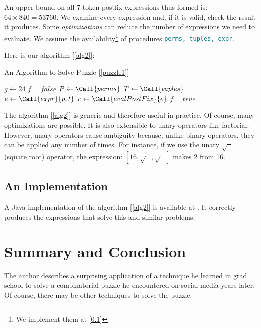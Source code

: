 \documentclass[english,smartquotes]{hgbarticle}
\begin{document}
An upper bound on all 7-token postfix expressions thus formed is: $64\times 840 = 53760$. We examine every expression and, if it is valid, check the result it produces. Some \emph{optimizations} can reduce the number of expressions we need to evaluate. We assume the availability\footnote{We implement them at [\ref{ss:impl}]} of procedures \texttt{\textcolor{teal}{perms, tuples, expr}}.  

Here is our algorithm [\ref{alg2}]:
\begin{algorithm}
\caption{An Algorithm to Solve Puzzle [\ref{puzzle1}]}
\label{alg2}
\begin{algorithmic}[2]
  \State $g \gets 24$ 
  \State $f = false$  
  \State $P \gets \Call{perms}$  
  \State $T \gets \Call{tuples}$  
      \State $e \gets \Call {expr}{p, t}$ 
      \State $r \gets \Call {evalPostFix}{e}$ 
	\State $f = true$
      \EndIf
    \EndFor
  \EndFor
        \State {}
  \EndIf
\end{algorithmic}
\end{algorithm}
The algorithm [\ref{alg2}] is generic and therefore useful in practice.  Of course, many optimizations are possible. It is also extensible to unary operators like factorial. However, unary operators cause ambiguity because, unlike binary operators, they can be applied any number of times. For instance, if we use the unary $\sqrt{\phantom{x}}$ (square root) operator, the expression: $[16, \sqrt{\phantom{x}}, \sqrt{\phantom{x}}]$ makes 2 from 16.
\subsection{An Implementation}
\label{ss:impl}
A Java implementation of the algorithm [\ref{alg2}] is available at \cite{Fazlur}. It correctly produces the expressions that solve this and similar problems.
\section{Summary and Conclusion}

The author describes a surprising application of a technique he learned in grad school to solve a combinatorial puzzle he encountered on social media years later. Of course, there may be other techniques to solve the puzzle. 
\end{document}
